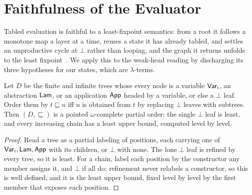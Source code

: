 \fi %

\ifColambdaAppendix
\appendix

\section{Faithfulness of the Evaluator}\label{app:faithful}
Tabled evaluation is faithful to a least-fixpoint semantics: from a root it follows a monotone map a layer at a time, reuses a state it has already tabled, and settles an unproductive cycle at $\bot$ rather than looping, and the graph it returns unfolds to the least fixpoint~\cite{vanemden-kowalski, tamaki-sato, tabling-slg}. We apply this to the weak-head reading by discharging its three hypotheses for our states, which are $\lambda$-terms.

\begin{lemma}\label{lem:order-llt}
  Let $D$ be the finite and infinite trees whose every node is a variable $\mathsf{Var}_i$, an abstraction
  $\mathsf{Lam}$, or an application $\mathsf{App}$ headed by a variable, or else a $\bot$ leaf. Order them by
  $t \sqsubseteq u$ iff $u$ is obtained from $t$ by replacing $\bot$ leaves with subtrees. Then
  $(D, \sqsubseteq)$ is a pointed $\omega$-complete partial order: the single $\bot$ leaf is least, and
  every increasing chain has a least upper bound, computed level by level.
\end{lemma}
\begin{proof}
  Read a tree as a partial labeling of positions, each carrying one of $\mathsf{Var}_i, \mathsf{Lam}, \mathsf{App}$
  with its children, or $\bot$ with none. The lone $\bot$ leaf is refined by every tree, so it is
  least. For a chain, label each position by the constructor any member assigns it, and $\bot$ if all
  do; refinement never relabels a constructor, so this is well defined, and it is the least upper
  bound, fixed level by level by the first member that exposes each position.
\end{proof}

